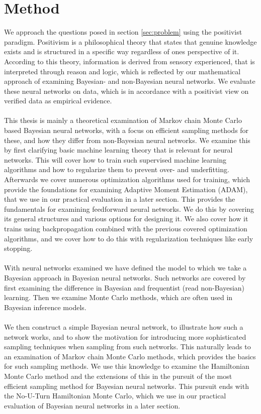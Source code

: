 \section{Method}
We approach the questions posed in section \ref{sec:problem} using the positivist paradigm. Positivism is a philosophical theory that states that genuine knowledge exists and is structured in a specific way regardless of ones perspective of it. According to this theory, information is derived from sensory experienced, that is interpreted through reason and logic, which is reflected by our mathematical approach of examining Bayesian- and non-Bayesian neural networks. We evaluate these neural networks on data, which is in accordance with a positivist view on verified data as empirical evidence. 
\\
\\
This thesis is mainly a theoretical examination of Markov chain Monte Carlo based Bayesian neural networks, with a focus on efficient sampling methods for these, and how they differ from non-Bayesian neural networks. We examine this by first clarifying basic machine learning theory that is relevant for neural networks. This will cover how to train such supervised machine learning algorithms and how to regularize them to prevent over- and underfitting. Afterwards we cover numerous optimization algorithms used for training, which provide the foundations for examining Adaptive Moment Estimation (ADAM), that we use in our practical evaluation in a later section. This provides the fundamentals for examining feedforward neural networks. We do this by covering its general structures and various options for designing it. We also cover how it trains using backpropagation combined with the previous covered optimization algorithms, and we cover how to do this with regularization techniques like early stopping.
\\
\\
With neural networks examined we have defined the model to which we take a Bayesian approach in Bayesian neural networks. Such networks are covered by first examining the difference in Bayesian and frequentist (read non-Bayesian) learning. Then we examine Monte Carlo methods, which are often used in Bayesian inference models.
\\
\\
We then construct a simple Bayesian neural network, to illustrate how such a network works, and to show the motivation for introducing more sophisticated sampling techniques when sampling from such networks. This naturally leads to an examination of Markov chain Monte Carlo methods, which provides the basics for such sampling methods. We use this knowledge to examine the Hamiltonian Monte Carlo method and the extensions of this in the pursuit of the most efficient sampling method for Bayesian neural networks. This pursuit ends with the No-U-Turn Hamiltonian Monte Carlo, which we use in our practical evaluation of Bayesian neural networks in a later section.
